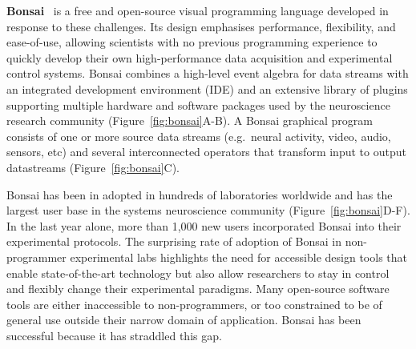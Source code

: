 \textbf{Bonsai}~\citep{lopesEtAl15,lopesAndMonteiro21} is a free and open-source visual programming language developed 
in response to these challenges.
Its design emphasises performance, flexibility, and ease-of-use,
allowing scientists with no previous programming experience to quickly develop
their own high-performance data acquisition and experimental control systems.
Bonsai combines a high-level event algebra for data streams with an integrated
development environment (IDE) and an extensive library of plugins supporting
multiple hardware and software packages used by the neuroscience research
community (Figure~\ref{fig:bonsai}A-B).
%
A Bonsai graphical program consists of one or more source data streams (e.g.\ neural activity, video, audio, sensors, etc)
and several interconnected operators that transform input to output
datastreams (Figure~\ref{fig:bonsai}C).

%



Bonsai has been in adopted in hundreds of laboratories worldwide and has the largest user base in the systems neuroscience community (Figure~\ref{fig:bonsai}D-F).  In the last year alone, more than 1,000 new users incorporated Bonsai into their experimental protocols. The surprising rate of adoption of Bonsai in non-programmer experimental
labs highlights the need for accessible design tools that enable
state-of-the-art technology but also allow researchers to stay in control and flexibly
change their experimental paradigms.  Many open-source software tools are
either inaccessible to non-programmers, or too constrained to be of general use
outside their narrow domain of application. Bonsai has been successful because
it has straddled this gap.

